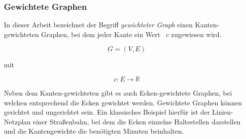 \subsubsection{Gewichtete Graphen}
In dieser Arbeit bezeichnet der Begriff \textit{gewichteter Graph} einen Kanten-gewichteten Graphen, bei dem jeder Kante ein Wert ~$c$ zugewiesen wird.

$$G = (V,E)$$ 
\begin{center}
mit
\end{center}
$$c: E \rightarrow \mathbb{R}$$

Neben dem Kanten-gewichteten gibt es auch Ecken-gewichtete Graphen, bei welchen entsprechend die Ecken gewichtet werden.
Gewichtete Graphen können gerichtet und ungerichtet sein.
Ein klassisches Beispiel hierfür ist der Linien-Netzplan einer Straßenbahn, bei dem die Ecken einzelne Haltestellen darstellen und die Kantengewichte die benötigten Minuten beinhalten.

